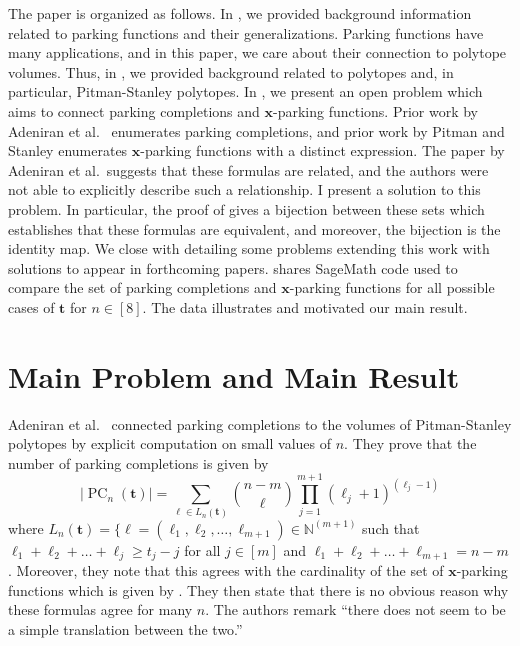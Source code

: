 \documentclass{amsart}
\theoremstyle{definition}
\numberwithin{equation}{section}
\newcommand{\PC}{\operatorname{PC}} %
\begin{document}
The paper is organized as follows.
In , we provided background information related to parking functions and their generalizations.
Parking functions have many applications, and in this paper, we care about their connection to polytope volumes.
Thus, in , we provided background related to polytopes and, in particular, Pitman-Stanley polytopes.
In , we present an open problem which aims to connect parking completions and $\mathbf{x}$-parking functions.
Prior work by Adeniran et al.\ \cite{bib:ParkingCompletions} enumerates parking completions, and prior work by Pitman and Stanley \cite{bib:PitmanStanley} enumerates $\mathbf{x}$-parking functions with a distinct expression.
The paper by Adeniran et al.\ suggests that these formulas are related, and the authors were not able to explicitly describe such a relationship.
I present a solution to this problem.
In particular, the proof of  
gives a bijection between these sets which establishes that these formulas are equivalent, and moreover, the bijection is the identity map.
We close with  detailing some problems extending this work with solutions to appear in forthcoming papers.
shares SageMath code used
to
compare the set of parking completions and $\mathbf{x}$-parking functions for all possible cases of $\mathbf{t}$ for $n \in [8]$. The data illustrates and motivated our main result.

\section{Main Problem and Main Result}\label{sec:main_problem_main_result_short_paper}

Adeniran et al.\ \cite{bib:ParkingCompletions} connected parking completions to the volumes of Pitman-Stanley polytopes by explicit computation on small values of $n$. 
They prove that the number of parking completions is given by
\begin{equation}\label{eqn:completions_count}
|\PC_n(\mathbf{t})| = \sum_{\mathbf{\ell} \in L_n(\mathbf{t})} \binom{n-m}{\mathbf{\ell}} \prod_{j=1}^{m+1} (\ell_j + 1)^{(\ell_j - 1)}
\end{equation}     
where $L_n (\mathbf{t})=\{\mathbf{\ell} = (\ell_1, \ell_2, \dots, \ell_{m+1} ) \in \mathbb{N}^{(m+1)}$ such that
$\ell_1 + \ell_2 + \dots + \ell_{j} \geq t_j - j$ for all $j \in [m]$ and $ \ell_1 + \ell_2 +  \dots + \ell_{m+1} = n-m$.
Moreover, they note that this agrees with the cardinality of the set of 
$\mathbf{x}$-parking functions which is given by .
They then state that there is no obvious reason why these formulas agree for many $n$.
The authors remark ``there does not seem to be a simple translation between the two.''
\end{document}
